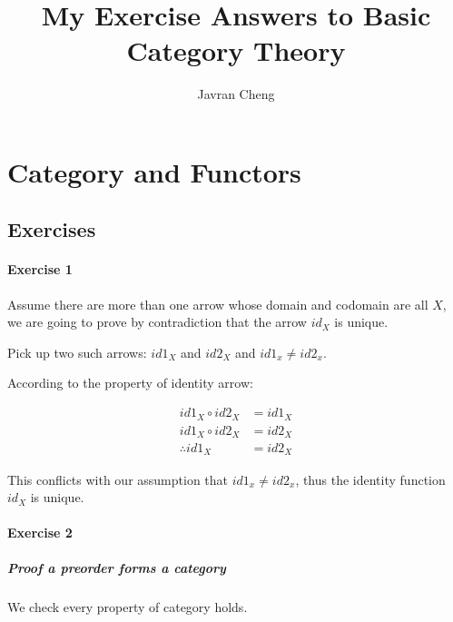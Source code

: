 \documentclass[11pt]{article}
\title{My Exercise Answers to
Basic Category Theory }
\author{Javran Cheng}
\begin{document}
\maketitle

\section{Category and Functors}

\subsection{Exercises}

\paragraph{Exercise 1}

Assume there are more than one arrow whose domain and codomain are all $X$,
we are going to prove by contradiction that the arrow $id_X$ is unique.

Pick up two such arrows: $id1_X$ and $id2_X$ and $id1_x \neq id2_x$.

According to the property of identity arrow:

\begin{align*}
id1_X \circ id2_X & = id1_X \\
id1_X \circ id2_X & = id2_X \\
\therefore id1_X & = id2_X
\end{align*}

This conflicts with our assumption that $id1_x \neq id2_x$,
thus the identity function $id_X$ is unique.

\paragraph{Exercise 2}

\subparagraph{Proof a preorder forms a category}

We check every property of category holds.
\end{document}
